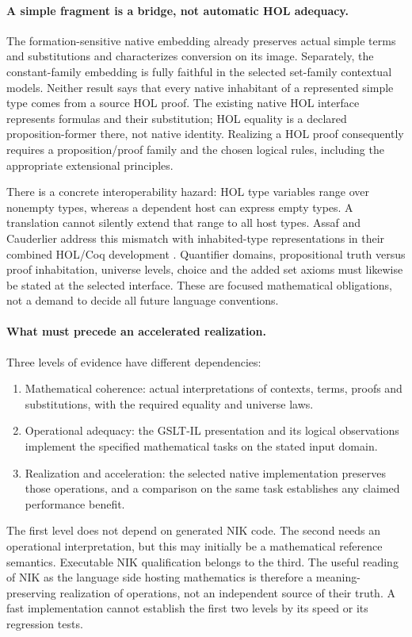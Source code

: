 \documentclass[11pt]{article}
\theoremstyle{definition}
\theoremstyle{remark}
\begin{document}
\paragraph{A simple fragment is a bridge, not automatic HOL adequacy.}
The formation-sensitive native embedding already preserves actual simple
terms and substitutions and characterizes conversion on its image.
Separately, the constant-family embedding is fully faithful in the selected
set-family contextual models. Neither result says that every native
inhabitant of a represented simple type comes from a source HOL proof.
The existing native HOL interface represents formulas and their substitution;
HOL equality is a declared proposition-former there, not native identity.
Realizing a HOL proof consequently requires a proposition/proof family and
the chosen logical rules, including the appropriate extensional principles.

There is a concrete interoperability hazard: HOL type variables range over
nonempty types, whereas a dependent host can express empty types. A translation
cannot silently extend that range to all host types. Assaf and Cauderlier
address this mismatch with inhabited-type representations in their combined
HOL/Coq development \cite{AssafCauderlierMixing}. Quantifier domains,
propositional truth versus proof inhabitation, universe levels, choice and
the added set axioms must likewise be stated at the selected interface.
These are focused mathematical obligations, not a demand to decide all
future language conventions.

\paragraph{What must precede an accelerated realization.}
Three levels of evidence have different dependencies:
\begin{enumerate}
  \item Mathematical coherence: actual interpretations of contexts, terms,
    proofs and substitutions, with the required equality and universe laws.
  \item Operational adequacy: the GSLT-IL presentation and its logical
    observations implement the specified mathematical tasks on the stated
    input domain.
  \item Realization and acceleration: the selected native implementation
    preserves those operations, and a comparison on the same task establishes
    any claimed performance benefit.
\end{enumerate}
The first level does not depend on generated NIK code. The second needs an
operational interpretation, but this may initially be a mathematical reference
semantics. Executable NIK qualification belongs to the third. The useful
reading of NIK as the language side hosting mathematics is therefore a
meaning-preserving realization of operations, not an independent source of
their truth. A fast implementation cannot establish the first two levels by
its speed or its regression tests.
\end{document}
